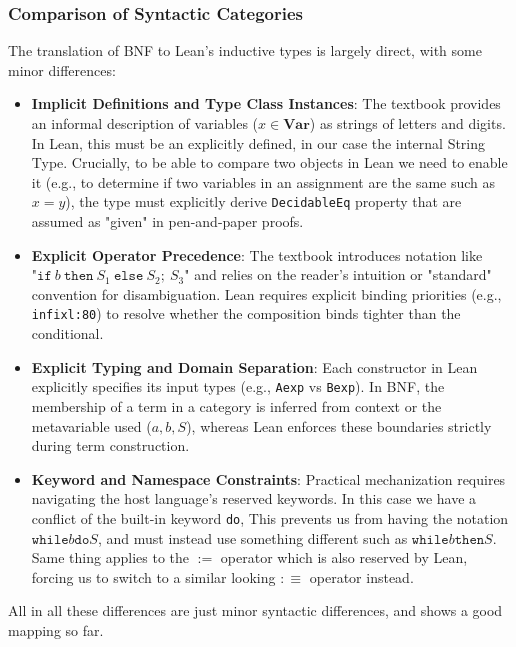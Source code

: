 \subsubsection*{Comparison of Syntactic Categories}
The translation of BNF to Lean's inductive types is largely direct, with some minor differences:
\begin{itemize}
    \item \textbf{Implicit Definitions and Type Class Instances}:
    The textbook provides an informal description of variables ($x \in \mathbf{Var}$)
    as strings of letters and digits. In Lean, this must be an explicitly defined,
    in our case the internal String Type.
    Crucially, to be able to compare two objects in Lean we need to enable it (e.g., to
    determine if two variables in an assignment are the same such as \(x = y\)), the type must
    explicitly derive \texttt{DecidableEq} property that
    are assumed as "given" in pen-and-paper proofs.

    \item \textbf{Explicit Operator Precedence}:
    The textbook introduces notation like \\
    "$\mathtt{if}\ b\ \mathtt{then}\ S_1\ \mathtt{else}\ S_2;\ S_3$" and relies on the
    reader's intuition or "standard" convention for disambiguation.
    Lean requires explicit binding priorities (e.g., \texttt{infixl:80}) to resolve
    whether the composition binds tighter than the conditional.

    \item \textbf{Explicit Typing and Domain Separation}:
    Each constructor in Lean explicitly specifies its input types
    (e.g., \texttt{Aexp} vs \texttt{Bexp}). In BNF, the membership of a
    term in a category is inferred from context or the metavariable used
    ($a, b, S$), whereas Lean enforces these boundaries strictly
    during term construction.

    \item \textbf{Keyword and Namespace Constraints}:
    Practical mechanization requires navigating the host language's reserved
    keywords. In this case we have a conflict of the built-in keyword \texttt{do},
    This prevents us from having the notation \(\mathtt{while } b \mathtt{ do } S\),
    and must instead use something different such as \(\mathtt{while } b \mathtt{ then } S\).
    Same thing applies to the \(:=\) operator which is also reserved by Lean,
    forcing us to switch to a similar looking \(:\equiv\) operator instead.
\end{itemize}
\noindent
All in all these differences are just minor syntactic differences, and shows a good mapping so far.


